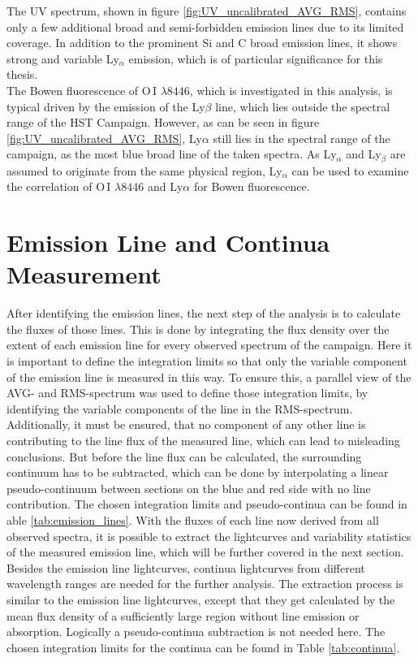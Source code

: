 The UV spectrum, shown in figure \ref{fig:UV_uncalibrated_AVG_RMS}, contains only a few additional broad and semi-forbidden emission lines due to its limited coverage. In addition to the prominent Si and C broad emission lines, it shows strong and variable Ly$_\alpha$ emission, which is of particular significance for this thesis. \\
The Bowen fluorescence of O\,I $\lambda 8446$, which is investigated in this analysis, is typical driven by the emission of the Ly$\beta$ line, which lies outside the spectral range of the HST Campaign. However, as can be seen in figure \ref{fig:UV_uncalibrated_AVG_RMS}, Ly$\alpha$  still lies in the spectral range of the campaign, as the most blue broad line of the taken spectra. As Ly$_\alpha$ and Ly$_\beta$ are assumed to originate from the same physical region, Ly$_\alpha$ can be used to examine the correlation of O\,I $\lambda 8446$ and Ly$\alpha$ for Bowen fluorescence.
 
 




\section{Emission Line and Continua Measurement}

After identifying the emission lines, the next step of the analysis is to calculate the fluxes of those lines. This is done by integrating the flux density over the extent of each emission line for every observed spectrum of the campaign. Here it is important to define the integration limits so that only the variable component of the emission line is measured in this way. To ensure this, a parallel view of the AVG- and RMS-spectrum was used to define those integration limits, by identifying the variable components of the line in the RMS-spectrum. Additionally, it must be ensured, that no component of any other line is contributing to the line flux of the measured line, which can lead to misleading conclusions. But before the line flux can be calculated, the surrounding continuum has to be subtracted, which can be done by interpolating a linear pseudo-continuum between sections on the blue and red side with no line contribution. The chosen integration limits and pseudo-continua can be found in able \ref{tab:emission_lines}. With the fluxes of each line now derived from all observed spectra, it is possible to extract the lightcurves and variability statistics of the measured emission line, which will be further covered in the next section.\\
Besides the emission line lightcurves, continua lightcurves from different wavelength ranges are needed for the further analysis. The extraction process is similar to the emission line lightcurves, except that they get calculated by the mean flux density of a sufficiently large region without line emission or absorption. Logically a pseudo-continua subtraction is not needed here. The chosen integration limits for the continua can be found in Table \ref{tab:continua}.



